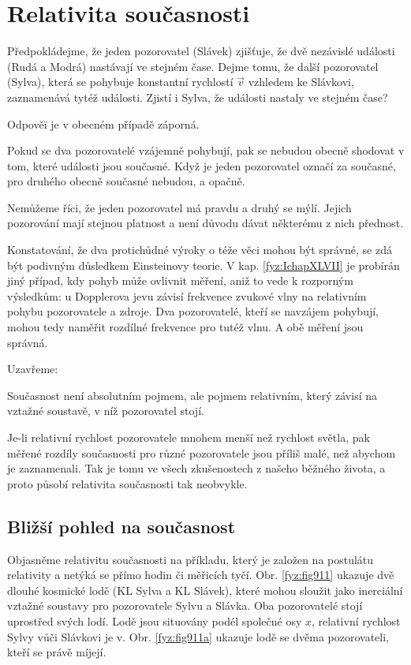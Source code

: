   \section{Relativita současnosti}
    Předpokládejme, že jeden pozorovatel (Slávek) zjišťuje, že dvě nezávislé události (Rudá a Modrá)
    nastávají ve stejném čase. Dejme tomu, že další pozorovatel (Sylva), která se pohybuje
    konstantní rychlostí \(\vec{v}\) vzhledem ke Slávkovi, zaznamenává tytéž události. Zjistí i
    Sylva, že události nastaly ve stejném čase?

    Odpověï je v obecném případě záporná.
    \begin{mdframed}[style=mdmathdef]           
      Pokud se dva pozorovatelé vzájemně pohybují, pak se nebudou obecně shodovat v tom, které
      události jsou současné. Když je jeden pozorovatel označí za současné, pro druhého obecně
      současné nebudou, a opačně.
    \end{mdframed}

    Nemůžeme říci, že jeden pozorovatel má pravdu a druhý se mýlí. Jejich pozorování mají stejnou
    platnost a není důvodu dávat některému z nich přednost.

    Konstatování, že dva protichůdné výroky o téže věci mohou být správné, se zdá být podivným
    důsledkem Einsteinovy teorie. V kap. \ref{fyz:IchapXLVII} je probírán jiný případ, kdy pohyb
    může ovlivnit měření, aniž to vede k rozporným výsledkům: u Dopplerova jevu závisí frekvence
    zvukové vlny na relativním pohybu pozorovatele a zdroje. Dva pozorovatelé, kteří se navzájem
    pohybují, mohou tedy naměřit rozdílné frekvence pro tutéž vlnu. A obě měření jsou správná.

    Uzavřeme:
    \begin{mdframed}[style=mdmathdef]           
      Současnost není absolutním pojmem, ale pojmem relativním, který závisí na vztažné soustavě,
      v níž pozorovatel stojí.
    \end{mdframed}

    Je-li relativní rychlost pozorovatele mnohem menší než rychlost světla, pak měřené rozdíly
    současnosti pro různé pozorovatele jsou příliš malé, než abychom je zaznamenali. Tak je tomu ve
    všech zkušenostech z našeho běžného života, a proto působí relativita současnosti tak neobvykle.

    \subsection{Bližší pohled na současnost}
      Objasněme relativitu současnosti na příkladu, který je založen na postulátu relativity a
      netýká se přímo hodin či měřicích tyčí. Obr. \ref{fyz:fig911} ukazuje dvě dlouhé kosmické lodě
      (KL Sylva a KL Slávek), které mohou sloužit jako inerciální vztažné soustavy pro pozorovatele
      Sylvu a Slávka. Oba pozorovatelé stojí uprostřed svých lodí. Lodě jsou situovány podél
      společné osy \(x\), relativní rychlost Sylvy vůči Slávkovi je v. Obr. \ref{fyz:fig911a}
      ukazuje lodě se dvěma pozorovateli, kteří se právě míjejí.

